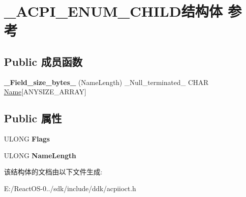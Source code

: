 \hypertarget{struct___a_c_p_i___e_n_u_m___c_h_i_l_d}{}\section{\+\_\+\+A\+C\+P\+I\+\_\+\+E\+N\+U\+M\+\_\+\+C\+H\+I\+L\+D结构体 参考}
\label{struct___a_c_p_i___e_n_u_m___c_h_i_l_d}
\subsection*{Public 成员函数}
\begin{DoxyCompactItemize}
\item 
\mbox{\label{struct___a_c_p_i___e_n_u_m___c_h_i_l_d_a89198eb455cce4cac07f6aeca73b9ee0}} 
{\bfseries \+\_\+\+Field\+\_\+size\+\_\+bytes\+\_\+} (Name\+Length) \+\_\+\+Null\+\_\+terminated\+\_\+ C\+H\+AR \hyperlink{struct_name_rec__}{Name}\mbox{[}A\+N\+Y\+S\+I\+Z\+E\+\_\+\+A\+R\+R\+AY\mbox{]}
\end{DoxyCompactItemize}
\subsection*{Public 属性}
\begin{DoxyCompactItemize}
\item 
\mbox{\label{struct___a_c_p_i___e_n_u_m___c_h_i_l_d_a01714ff3030447c4afd34ab6fc5924d6}} 
U\+L\+O\+NG {\bfseries Flags}
\item 
\mbox{\label{struct___a_c_p_i___e_n_u_m___c_h_i_l_d_a15b3fb19c5e8113323879a415b2877a3}} 
U\+L\+O\+NG {\bfseries Name\+Length}
\end{DoxyCompactItemize}


该结构体的文档由以下文件生成\+:\begin{DoxyCompactItemize}
\item 
E\+:/\+React\+O\+S-\/0../sdk/include/ddk/acpiioct.\+h\end{DoxyCompactItemize}
